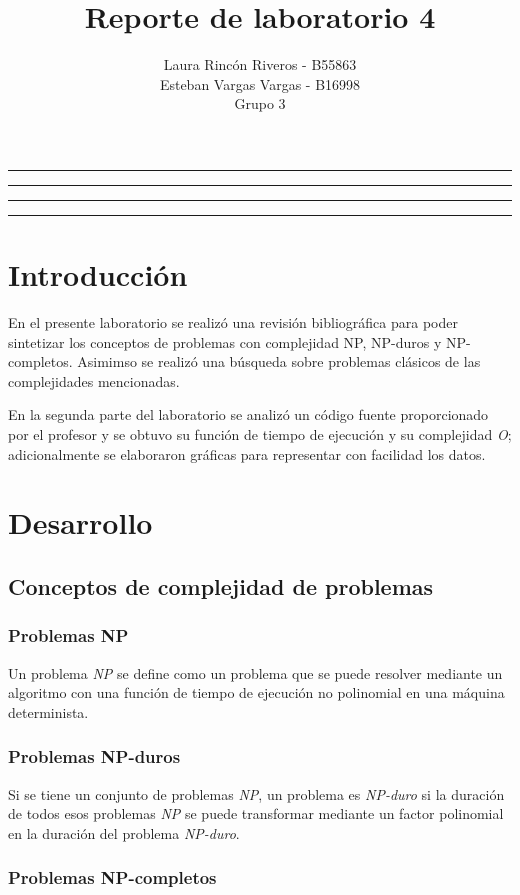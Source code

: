 \documentclass[11pt]{article}
\title{Reporte de laboratorio 4}
\author{Laura Rincón Riveros - B55863\\Esteban Vargas Vargas - B16998\\ Grupo 3}
\begin{document}
\maketitle
\hrule
\hrule
\tableofcontents
\hspace{5mm}
\hrule
\hrule

\section{Introducción}

En el presente laboratorio se realizó una revisión bibliográfica para poder sintetizar los conceptos de problemas con complejidad NP, NP-duros y NP-completos. Asimimso se realizó una búsqueda sobre problemas clásicos de las complejidades mencionadas.

En la segunda parte del laboratorio se analizó un código fuente proporcionado por el profesor y se obtuvo su función de tiempo de ejecución y su complejidad \textit{O}; adicionalmente se elaboraron gráficas para representar con facilidad los datos.


\newpage
\section{Desarrollo}

\subsection{Conceptos de complejidad de problemas}

\subsubsection{Problemas NP}
Un problema \textit{NP} se define como un problema que se puede resolver mediante un algoritmo con una función de tiempo de ejecución no polinomial en una máquina determinista. 
\subsubsection{Problemas NP-duros}
Si se tiene un conjunto de problemas \textit{NP}, un problema es \textit{NP-duro} si la duración de todos esos problemas \textit{NP} se puede 
transformar mediante un factor polinomial en la duración del problema \textit{NP-duro}.

\subsubsection{Problemas NP-completos}
\end{document}
